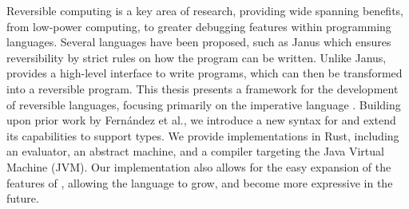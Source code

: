 
Reversible computing\cite{IntroductionToReversibleComputing} is a key area of research, providing wide spanning benefits, from low-power computing\cite{landauerIrreversibility}, to greater debugging features\cite{PrologDebugger} within programming languages. Several languages have been proposed, such as Janus\cite{Janus} which ensures reversibility by strict rules on how the program can be written. Unlike Janus, \rimplang provides a high-level interface to write programs, which can then be transformed into a reversible program.
This thesis presents a framework for the development of reversible languages, focusing primarily on the imperative language \rimplang. Building upon prior work by Fernández et al.\cite{Rimp}, we introduce a new syntax for \rimplang and extend its capabilities to support types. We provide implementations in Rust, including an evaluator, an abstract machine, and a compiler targeting the Java Virtual Machine (JVM). Our implementation also allows for the easy expansion of the features of \rimplang, allowing the language to grow, and become more expressive in the future.
